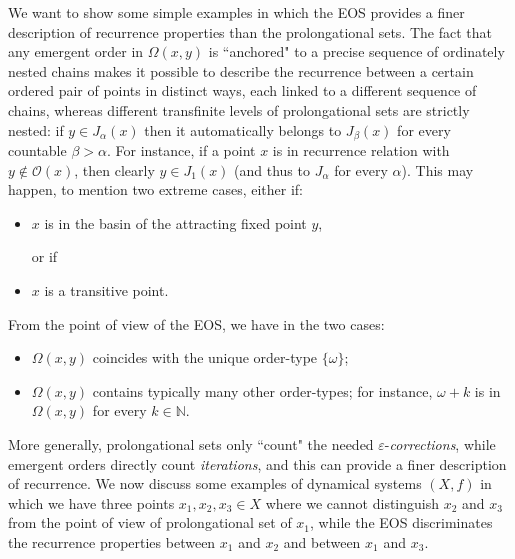 \documentclass[10pt,a4paper]{article}
\theoremstyle{definition}
\theoremstyle{remark}
\theoremstyle{plain}
\begin{document}
We want to show some simple examples in which the EOS provides a finer description of recurrence properties than the prolongational sets. The fact that any emergent order in $\Omega(x,y)$ is ``anchored" to a precise sequence of ordinately nested chains makes it possible to describe the recurrence between a certain ordered pair of points in distinct ways, each linked to a different sequence of chains, whereas different transfinite levels of prolongational sets are strictly nested: if $y\in J_\alpha(x)$ then it automatically belongs to $J_\beta(x)$ for every countable $\beta>\alpha$. For instance, if a point $x$ is in recurrence relation with $y\notin\mathcal{O}(x)$, then clearly $y\in J_1(x)$ (and thus to $J_\alpha$ for every $\alpha$). This may happen, to mention two extreme cases, either if: 
\begin{itemize}
    \item  $x$ is in the basin of the attracting fixed point $y$, 
    
    or if
    \item $x$ is a transitive point.
\end{itemize}
From the point of view of the EOS, we have in the two cases:
\begin{itemize}
    \item $\Omega(x,y)$ coincides with the unique order-type $\{\omega\}$;
    \item $\Omega(x,y)$ contains typically many other order-types; for instance, $\omega+k$ is in $\Omega(x,y)$ for every $k\in\mathbb{N}$.
\end{itemize}

More generally, prolongational sets only ``count" the needed $\varepsilon$-\textit{corrections}, while emergent orders directly count \textit{iterations}, and this can provide a finer description of recurrence. We now discuss some examples of dynamical systems $(X,f)$ in which we have three points $x_1,x_2,x_3\in X$ where we cannot distinguish $x_2$ and $x_3$ from the point of view of prolongational set of $x_1$, while the EOS discriminates the recurrence properties between $x_1$ and $x_2$ and between $x_1$ and $x_3$. 
\end{document}
